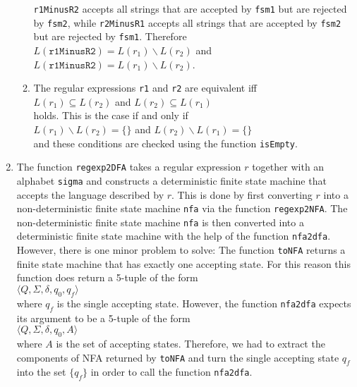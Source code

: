 \begin{enumerate}
\begin{enumerate}
            \texttt{r1MinusR2} accepts all strings that are accepted by \texttt{fsm1} but
            are rejected by \texttt{fsm2},  while
            \texttt{r2MinusR1} accepts all strings that are accepted by \texttt{fsm2} but
            are rejected by \texttt{fsm1}.  Therefore
            \\[0.2cm]
            \hspace*{1.3cm}
            $L(\mathtt{r1MinusR2}) = L(r_1) \backslash L(r_2)$ \quad and \quad
            $L(\mathtt{r1MinusR2}) = L(r_1) \backslash L(r_2)$.
      \item The regular expressions \texttt{r1} and \texttt{r2} are equivalent iff
            \\[0.2cm]
            \hspace*{1.3cm}
            $L(r_1) \subseteq L(r_2)$ \quad and \quad $L(r_2) \subseteq L(r_1)$
            \\[0.2cm]
            holds.  This is the case if and only if
            \\[0.2cm]
            \hspace*{1.3cm}
            $L(r_1) \backslash L(r_2) = \{\}$ \quad and \quad
            $L(r_2) \backslash L(r_1) = \{\}$
            \\[0.2cm]
            and these conditions are checked using the function \texttt{isEmpty}.
      \end{enumerate}
\item The function \texttt{regexp2DFA} takes a regular expression $r$ together
      with an alphabet \texttt{sigma} and constructs a deterministic finite state machine
      that accepts the language described by $r$.  This is done by first converting
      $r$ into a non-deterministic finite state machine \texttt{nfa} via the function
      \texttt{regexp2NFA}.  The non-deterministic finite state machine \texttt{nfa} is then
      converted into a deterministic finite state machine with the help of the function
      \texttt{nfa2dfa}.  However, there is one minor problem to solve:  The function
      \texttt{toNFA} returns a finite state machine that has exactly one accepting state.
      For this reason this function does return a 5-tuple of the form
      \\[0.2cm]
      \hspace*{1.3cm}
      $\langle Q, \Sigma, \delta, q_0, q_f \rangle$
      \\[0.2cm]
      where $q_f$ is the single accepting state.  However, the function \texttt{nfa2dfa} expects its argument
      to be a 5-tuple of the form
      \\[0.2cm]
      \hspace*{1.3cm}
      $\langle Q, \Sigma, \delta, q_0, A \rangle$
      \\[0.2cm]
      where $A$ is the set of accepting states.  Therefore, we had to extract the components of 
      NFA returned by \texttt{toNFA} and turn the single accepting state $q_f$ into the set 
      $\{ q_f \}$ in order to call the function \texttt{nfa2dfa}.


\end{enumerate}

